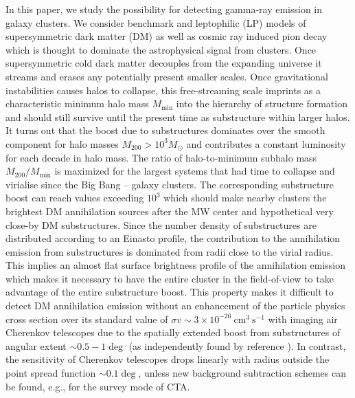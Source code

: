 \documentclass[10pt,aps,pra,reprint,amsmath,amsfonts,amssymb,showpacs,nofootinbib,floatfix]{revtex4-1}
\newcommand{\msun}{M_\odot}
\newcommand{\mvir}{M_{200}}
\begin{document}
In this paper, we study the possibility for detecting gamma-ray
emission in galaxy clusters. We consider benchmark and leptophilic
(LP) models of supersymmetric dark matter (DM) as well as cosmic ray
induced pion decay which is thought to dominate the astrophysical
signal from clusters. Once supersymmetric cold dark matter decouples
from the expanding universe it streams and erases any potentially
present smaller scales. Once gravitational instabilities causes halos
to collapse, this free-streaming scale imprints as a characteristic
minimum halo mass $M_\mathrm{min}$ into the hierarchy of structure
formation and should still survive until the present time as
substructure within larger halos. It turns out that the boost due to
substructures dominates over the smooth component for halo masses
$\mvir>10^3 \msun$ and contributes a constant luminosity for each
decade in halo mass. The ratio of halo-to-minimum subhalo mass
$\mvir/M_\mathrm{min}$ is maximized for the largest systems that had
time to collapse and virialise since the Big Bang -- galaxy
clusters. The corresponding substructure boost can reach values
exceeding $10^3$ which should make nearby clusters the brightest DM
annihilation sources after the MW center and hypothetical very
close-by DM substructures. Since the number density of substructures
are distributed according to an Einasto profile, the contribution to
the annihilation emission from substructures is dominated from radii
close to the virial radius. This implies an almost flat surface
brightness profile of the annihilation emission which makes it
necessary to have the entire cluster in the field-of-view to take
advantage of the entire substructure boost.  This property makes it
difficult to detect DM annihilation emission without an enhancement of
the particle physics cross section over its standard value of $\sigma
v\sim 3\times 10^{-26} ~\mathrm{cm}^3~\mathrm{s}^{-1}$ with imaging
air Cherenkov telescopes due to the spatially extended boost from
substructures of angular extent $\sim 0.5-1\deg$ (as independently
found by reference \cite{2011arXiv1104.3530S}). In contrast, the
sensitivity of Cherenkov telescopes drops linearly with radius outside
the point spread function $\sim 0.1\deg$, unless new background
subtraction schemes can be found, e.g., for the survey mode of CTA.
\end{document}
